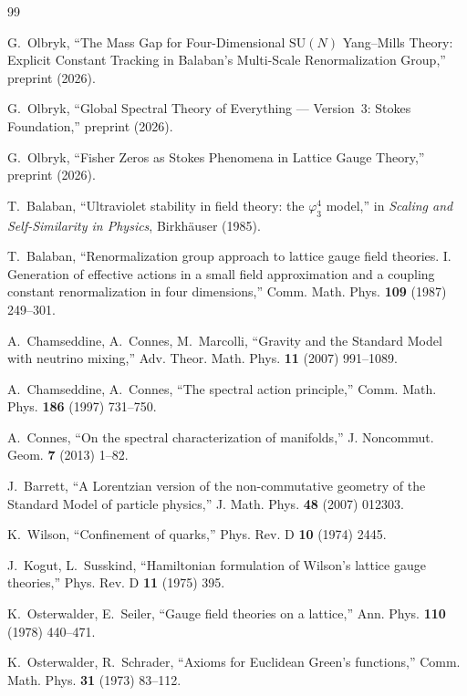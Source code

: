 \documentclass[12pt]{article}
\theoremstyle{definition}
\theoremstyle{remark}
\newcommand{\SU}{\mathrm{SU}}
\begin{document}
\begin{thebibliography}{99}

G.~Olbryk, ``The Mass Gap for Four-Dimensional $\SU(N)$ Yang--Mills
Theory: Explicit Constant Tracking in Balaban's Multi-Scale
Renormalization Group,'' preprint (2026).

G.~Olbryk, ``Global Spectral Theory of Everything --- Version~3:
Stokes Foundation,'' preprint (2026).

G.~Olbryk, ``Fisher Zeros as Stokes Phenomena in Lattice Gauge
Theory,'' preprint (2026).

T.~Balaban, ``Ultraviolet stability in field theory: the $\varphi^4_3$
model,'' in \emph{Scaling and Self-Similarity in Physics}, Birkh\"auser
(1985).

T.~Balaban, ``Renormalization group approach to lattice gauge field
theories. I. Generation of effective actions in a small field
approximation and a coupling constant renormalization in four
dimensions,'' Comm. Math. Phys. \textbf{109} (1987) 249--301.

A.~Chamseddine, A.~Connes, M.~Marcolli, ``Gravity and the Standard
Model with neutrino mixing,'' Adv. Theor. Math. Phys. \textbf{11}
(2007) 991--1089.

A.~Chamseddine, A.~Connes, ``The spectral action principle,''
Comm. Math. Phys. \textbf{186} (1997) 731--750.

A.~Connes, ``On the spectral characterization of manifolds,''
J. Noncommut. Geom. \textbf{7} (2013) 1--82.

J.~Barrett, ``A Lorentzian version of the non-commutative geometry of
the Standard Model of particle physics,'' J. Math. Phys. \textbf{48}
(2007) 012303.

K.~Wilson, ``Confinement of quarks,'' Phys. Rev. D \textbf{10} (1974)
2445.

J.~Kogut, L.~Susskind, ``Hamiltonian formulation of Wilson's lattice
gauge theories,'' Phys. Rev. D \textbf{11} (1975) 395.

K.~Osterwalder, E.~Seiler, ``Gauge field theories on a lattice,''
Ann. Phys. \textbf{110} (1978) 440--471.

K.~Osterwalder, R.~Schrader, ``Axioms for Euclidean Green's
functions,'' Comm. Math. Phys. \textbf{31} (1973) 83--112.


\end{thebibliography}
\end{document}
